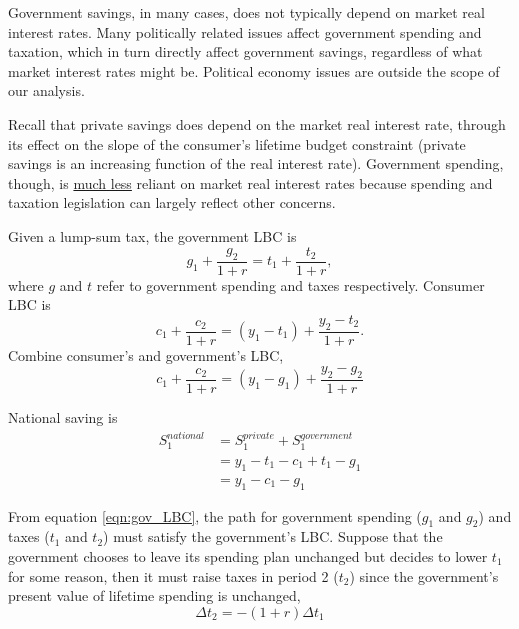 \documentclass[10pt]{article}
\begin{document}
Government savings, in many cases, does not typically depend on market real interest rates.
Many politically related issues affect government spending and taxation, which in turn directly
affect government savings, regardless of what market interest rates might be. Political economy
issues are outside the scope of our analysis.

Recall that private savings does depend on the market real interest rate, through its effect on 
the slope of the consumer's lifetime budget constraint (private savings is an increasing function
of the real interest rate). Government spending, though, is {\underline {much less}} reliant on
market real interest rates because spending and taxation legislation can largely reflect other
concerns.


Given a lump-sum tax, the government LBC is
\begin{equation}
g_1 + \frac{g_2}{1 + r} = t_1 + \frac{t_2}{1 + r}, \label{eqn:gov_LBC}
\end{equation}
where $ g $ and $ t $ refer to government spending and taxes respectively.
Consumer LBC is
\begin{equation}
c_1 + \frac{c_2}{1 + r} = (y_1 - t_{1}) + \frac{y_2 - t_2}{1 + r}. \label{eqn:consumer_LBC}
\end{equation}
Combine consumer's and government's LBC, 
\begin{equation}
c_1 + \frac{c_2}{1 + r} = (y_1 - g_1) + \frac{y_2 - g_2}{1 + r} \label{eqn:gov_con_LBC}
\end{equation}

National saving is
\begin{align}
S_1^{national} &= S_1^{private} + S_1^{government}\\
&= y_1 - t_1 - c_1 + t_1 - g_1\\
&= y_1 - c_1 - g_1 \label{eqn:national_savins}
\end{align}


From equation \eqref{eqn:gov_LBC}, the path for government spending ($ g_1 $ and $ g_2 $) and
taxes ($ t_1 $ and $ t_2 $) must satisfy the government's LBC. Suppose that the government 
chooses to leave its spending plan unchanged but decides to lower $ t_1 $ for some reason, then it
must raise taxes in period 2 ($ t_2 $) since the government's present value of lifetime spending
is unchanged,
\begin{equation}
\Delta t_2 =  - (1 + r) \Delta t_1 \label{eqn:timing_of_taxes}
\end{equation}
\end{document}
